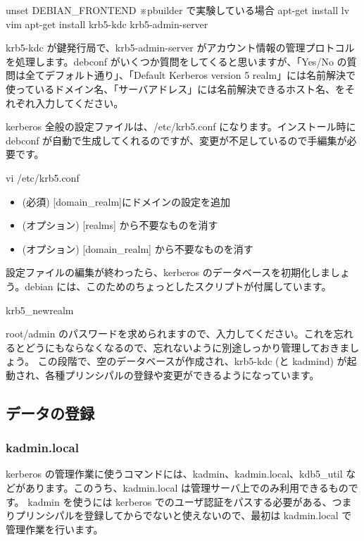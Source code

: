 \documentclass[mingoth,a4paper]{jsarticle}
\begin{document}
\begin{commandline}
unset DEBIAN_FRONTEND ※pbuilder で実験している場合
apt-get install lv vim
apt-get install krb5-kdc krb5-admin-server
\end{commandline}

krb5-kdc が鍵発行局で、krb5-admin-server がアカウント情報の管理プロトコルを処理します。debconf がいくつか質問をしてくると思いますが、「Yes/No の質問は全てデフォルト通り」、「Default Kerberos version 5 realm」には名前解決で使っているドメイン名、「サーバアドレス」には名前解決できるホスト名、をそれぞれ入力してください。

kerberos 全般の設定ファイルは、/etc/krb5.conf になります。インストール時に debconf が自動で生成してくれるのですが、変更が不足しているので手編集が必要です。

\begin{commandline}
vi /etc/krb5.conf
\end{commandline}

\begin{itemize}
\item (必須) [domain\_realm]にドメインの設定を追加
\item (オプション) [realms] から不要なものを消す
\item (オプション) [domain\_realm] から不要なものを消す
\end{itemize}

設定ファイルの編集が終わったら、kerberos のデータベースを初期化しましょう。debian には、このためのちょっとしたスクリプトが付属しています。

\begin{commandline}
krb5_newrealm
\end{commandline}

root/admin のパスワードを求められますので、入力してください。これを忘れるとどうにもならなくなるので、忘れないように別途しっかり管理しておきましょう。
この段階で、空のデータベースが作成され、krb5-kdc (と kadmind) が起動され、各種プリンシパルの登録や変更ができるようになっています。

\subsection{データの登録}

\subsubsection{kadmin.local}

kerberos の管理作業に使うコマンドには、kadmin、kadmin.local、kdb5\_util などがあります。このうち、kadmin.local は管理サーバ上でのみ利用できるものです。
kadmin を使うには kerberos でのユーザ認証をパスする必要がある、つまりプリンシパルを登録してからでないと使えないので、最初は kadmin.local で管理作業を行います。
\end{document}
